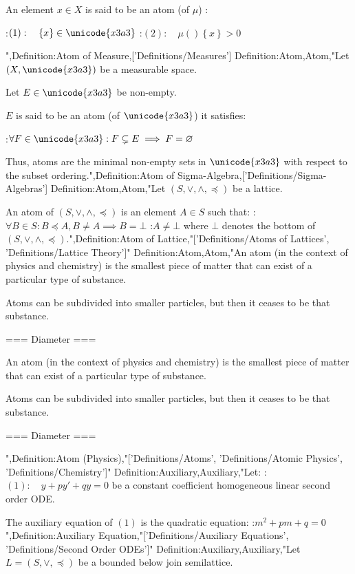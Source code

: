 An element $x \in X$ is said to be an atom (of $\mu$) :

:$(1): \quad \left\lbrace x \right\rbrace \in \unicode{x3a3}$
:$(2): \quad \mu \left(   \right){\left\lbrace x \right\rbrace} > 0$

",Definition:Atom of Measure,['Definitions/Measures']
Definition:Atom,Atom,"Let $\left( X, \unicode{x3a3} \right)$ be a measurable space.

Let $E \in \unicode{x3a3}$ be non-empty.


$E$ is said to be an atom (of $\unicode{x3a3}$)  it satisfies:

:$\forall F \in \unicode{x3a3}: F \subsetneq E \implies F = \varnothing$


Thus, atoms are the minimal non-empty sets in $\unicode{x3a3}$ with respect to the subset ordering.",Definition:Atom of Sigma-Algebra,['Definitions/Sigma-Algebras']
Definition:Atom,Atom,"Let $\left( S, \vee, \wedge, \preceq \right)$ be a lattice.


An atom of $\left( S, \vee, \wedge, \preceq \right)$ is an element $A \in S$ such that:
:$\forall B \in S: B \preceq A, B \ne A \implies B = \bot$
:$A \ne \bot$
where $\bot$ denotes the bottom of $\left( S, \vee, \wedge, \preceq \right)$.",Definition:Atom of Lattice,"['Definitions/Atoms of Lattices', 'Definitions/Lattice Theory']"
Definition:Atom,Atom,"An atom (in the context of physics and chemistry) is the smallest piece of matter that can exist of a particular type of substance.


Atoms can be subdivided into smaller particles, but then it ceases to be that substance.


=== Diameter ===

An atom (in the context of physics and chemistry) is the smallest piece of matter that can exist of a particular type of substance.


Atoms can be subdivided into smaller particles, but then it ceases to be that substance.


=== Diameter ===

",Definition:Atom (Physics),"['Definitions/Atoms', 'Definitions/Atomic Physics', 'Definitions/Chemistry']"
Definition:Auxiliary,Auxiliary,"Let:
:$(1): \quad y + p y' + q y = 0$
be a constant coefficient homogeneous linear second order ODE.


The auxiliary equation of $(1)$ is the quadratic equation:
:$m^2 + p m + q = 0$",Definition:Auxiliary Equation,"['Definitions/Auxiliary Equations', 'Definitions/Second Order ODEs']"
Definition:Auxiliary,Auxiliary,"Let $L = \left( S, \vee, \preceq \right)$ be a bounded below join semilattice.

